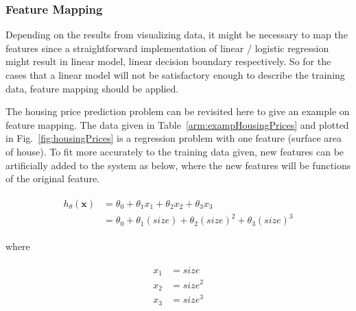 \subsubsection{Feature Mapping}

Depending on the results from visualizing data, it might be necessary to map the features since a straightforward implementation of linear / logistic regression might result in linear model, linear decision boundary respectively. 
So for the cases that a linear model will not be satisfactory enough to describe the training data, feature mapping should be applied.

The housing price prediction problem can be revisited here to give an example on feature mapping.
The data given in Table~\ref{arm:exampHousingPrices} and plotted in Fig.~\ref{fig:housingPrices} is a regression problem with one feature (surface area of house).
To fit more accurately to the training data given, new features can be artificially added to the system as below, where the new features will be functions of the original feature.

\begin{align}
\label{eqn:costFuncExamp1}
\begin{split}
h_{\theta}(\bm{x}) & = \theta_0 + \theta_1 x_1 + \theta_2 x_2 + \theta_3 x_3
\\
& = \theta_0 + \theta_1 (size) + \theta_2 {(size)}^2 + \theta_3 {(size)}^3
\end{split}
\end{align}

where

\begin{align}
\label{eqn:featureMapping1}
\begin{split}
x_1 & = size
\\
x_2 & = size^2
\\
x_3 & = size^3
\end{split}
\end{align}

